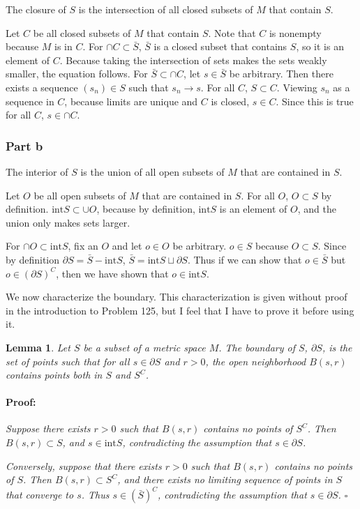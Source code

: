 \documentclass{article}
\newenvironment{proof}{\paragraph{Proof:}}{\hfill$\square$}
\newtheorem{lemma}[theorem]{Lemma}
\newcommand{\inter}{\text{int}}
\begin{document}
The closure of $S$ is the intersection of all closed subsets of $M$ that contain $S$.

Let $C$ be all closed subsets of $M$ that contain $S$. Note that $C$ is nonempty because $M$ is in $C$. For $\cap C \subset \bar{S}$, $\bar{S}$ is a closed subset that contains $S$, so it is an element of $C$. Because taking the intersection of sets makes the sets weakly smaller, the equation follows. For $\bar{S} \subset \cap C$, let $s \in \bar{S}$ be arbitrary. Then there exists a sequence $(s_n) \in S$ such that $s_n \rightarrow s$. For all $C$, $S \subset C$. Viewing $s_n$ as a sequence in $C$, because limits are unique and $C$ is closed, $s \in C$. Since this is true for all $C$, $s \in \cap C$.

\subsubsection*{Part b}

The interior of $S$ is the union of all open subsets of $M$ that are contained in $S$.

Let $O$ be all open subsets of $M$ that are contained in $S$. For all $O$, $O \subset S$ by definition. $\inter S \subset \cup O$, because by definition, $\inter S$ is an element of $O$, and the union only makes sets larger.

For $\cap O \subset \inter S$, fix an $O$ and let $o \in O$ be arbitrary. $o \in S$ because $O \subset S$. Since by definition $\partial S = \bar{S} - \inter S$, $\bar{S} = \inter S \sqcup \partial S$. Thus if we can show that $o \in \bar{S}$ but $o \in (\partial S)^C$, then we have shown that $o \in \inter S$.

We now characterize the boundary. This characterization is given without proof in the introduction to Problem 125, but I feel that I have to prove it before using it.

\begin{lemma}
\label{LemmaBoundaryContainsSandSC}
Let $S$ be a subset of a metric space $M$. The boundary of $S$, $\partial S$, is the set of points such that for all $s \in \partial S$ and $r > 0$, the open neighborhood $B(s, r)$ contains points both in $S$ and $S^C$.
\begin{proof}
Suppose there exists $r > 0$ such that $B(s, r)$ contains no points of $S^C$. Then $B(s, r) \subset S$, and $s \in \inter S$, contradicting the assumption that $s \in \partial S$.

Conversely, suppose that there exists $r > 0$ such that $B(s, r)$ contains no points of $S$. Then $B(s, r) \subset S^C$, and there exists no limiting sequence of points in $S$ that converge to $s$. Thus $s \in (\bar{S})^C$, contradicting the assumption that $s \in \partial S$.
\end{proof}
\end{lemma}
\end{document}
